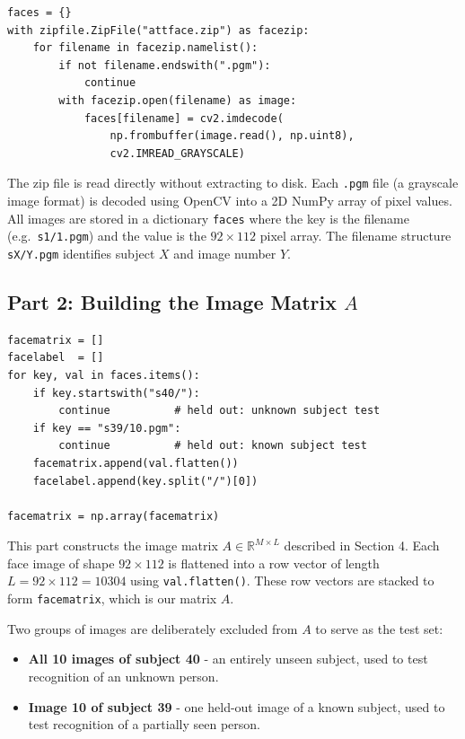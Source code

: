 \documentclass[12pt,a4paper]{article}
\begin{document}
\begin{lstlisting}
faces = {}
with zipfile.ZipFile("attface.zip") as facezip:
    for filename in facezip.namelist():
        if not filename.endswith(".pgm"):
            continue
        with facezip.open(filename) as image:
            faces[filename] = cv2.imdecode(
                np.frombuffer(image.read(), np.uint8),
                cv2.IMREAD_GRAYSCALE)
\end{lstlisting}

The zip file is read directly without extracting to disk. Each \texttt{.pgm}
file (a grayscale image format) is decoded using OpenCV into a 2D NumPy array
of pixel values. All images are stored in a dictionary \texttt{faces} where
the key is the filename (e.g.\ \texttt{s1/1.pgm}) and the value is the
$92 \times 112$ pixel array. The filename structure
\texttt{sX/Y.pgm} identifies subject $X$ and image number $Y$.

\subsection{Part 2: Building the Image Matrix $A$}

\begin{lstlisting}
facematrix = []
facelabel  = []
for key, val in faces.items():
    if key.startswith("s40/"):
        continue          # held out: unknown subject test
    if key == "s39/10.pgm":
        continue          # held out: known subject test
    facematrix.append(val.flatten())
    facelabel.append(key.split("/")[0])

facematrix = np.array(facematrix)
\end{lstlisting}

This part constructs the image matrix $A \in \mathbb{R}^{M \times L}$
described in Section 4. Each face image of shape $92 \times 112$ is
flattened into a row vector of length $L = 92 \times 112 = 10304$ using
\texttt{val.flatten()}. These row vectors are stacked to form \texttt{facematrix},
which is our matrix $A$.

Two groups of images are deliberately excluded from $A$ to serve as the
test set:
\begin{itemize}
    \item \textbf{All 10 images of subject 40} - an entirely unseen subject,
          used to test recognition of an unknown person.
    \item \textbf{Image 10 of subject 39} - one held-out image of a known
          subject, used to test recognition of a partially seen person.
\end{itemize}
\end{document}
